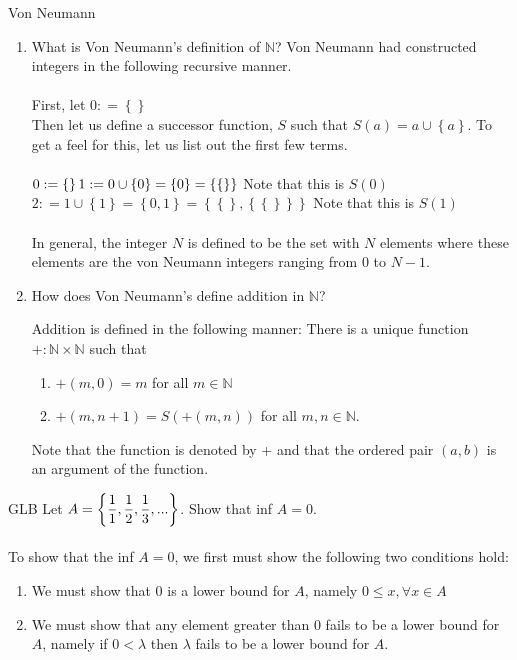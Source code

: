 \documentclass[12pt]{article}
\begin{document}
\problem Von Neumann ~
\begin{enumerate}
\item What is Von Neumann's definition of ${\mathbb{N}}$? Von Neumann had constructed integers in the following recursive manner. \\ \\ 
First, let 
$0: = \left\lbrace \right\rbrace $ \\
Then let us define a successor function, $S$ such that $S(a) = a \cup \left\lbrace a \right\rbrace$.
To get a feel for this, let us list out the first few terms. \\ \\
$0: = \left\lbrace \right\rbrace \\
1: = 0 \cup \left\lbrace 0 \right\rbrace = \left\lbrace0 \right\rbrace = \left\lbrace \left\lbrace \right\rbrace \right\rbrace$ \hfill Note that this is $S(0)$ \\
$2: = 1 \cup \left\lbrace 1 \right\rbrace = \left\lbrace 0,1 \right\rbrace = \left\lbrace \left\lbrace \right\rbrace, \left\lbrace \left\lbrace \right\rbrace \right\rbrace \right\rbrace $ \hfill Note that this is $S(1)$ \\ \\
In general, the integer $N$ is defined to be the set with $N$ elements where these elements are the von Neumann integers ranging from $0$ to $N-1$. \\
\item How does Von Neumann's define addition in ${\mathbb{N}}$? 

Addition is defined in the following manner: There is a unique function $+: \mathbb{N} \times \mathbb{N}$ such that
\begin{enumerate}
\item $+(m,0)=m$ for all $m \in {\mathbb{N}}$
\item $+(m,n+1)=S(+(m,n))$ for all $m,n \in {\mathbb{N}}$.
\end{enumerate}
Note that the function is denoted by + and that the ordered pair $(a,b)$ is an argument of the function.
\end{enumerate}
\problem GLB
Let $A= \left\{\dfrac{1}{1},\dfrac{1}{2},\dfrac{1}{3},...\right\}$. Show that inf $A = 0$. \\ \\
To show that the inf $A = 0$, we first must show the following two conditions hold:\\ 
\begin{enumerate}
\item We must show that $0$ is a lower bound for $A$, namely $0 \leq x , \forall x \in A$ ~\\
\item We must show that any element greater than $0$ fails to be a lower bound for $A$, namely if $0 < \lambda$ then $\lambda$ fails to be a lower bound for $A$.
\end{enumerate} 
\end{document}
